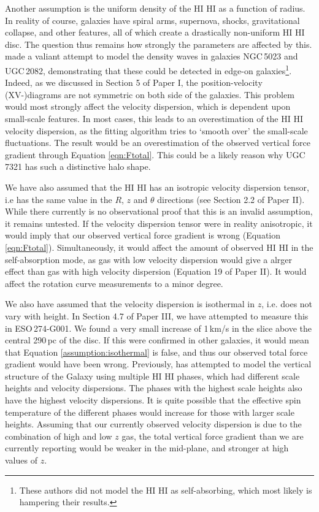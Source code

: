 \documentclass[useAMS,usenatbib]{mn2e}
\newcommand{\hi}{%
  \relax
  \ifmmode
    \textrm{\textsc{HI}}
  \else
    \textsc{H{\smaller}I}
  \fi
}
\begin{document}
Another assumption is the uniform density of the \hi as a function of radius.
In reality of course, galaxies have spiral arms, supernova, shocks, 
gravitational collapse, and other features, all of which create a 
drastically non-uniform \hi disc. 
The question thus remains how strongly the parameters are affected by this. 
\citet{Kamphuis2013A} made a valiant attempt to model the density waves 
in galaxies NGC\,5023 and UGC\,2082, demonstrating that these could be 
detected in edge-on galaxies\footnote{These authors did not 
model the \hi as self-absorbing, which most likely is hampering their results.}.
Indeed, as we discussed in Section 5 of Paper I, the position-velocity 
(XV-)diagrams are not symmetric on both side of the galaxies.
This problem would most strongly affect the velocity dispersion, which is 
dependent upon small-scale features. 
In most cases, this leads to an overestimation of the \hi velocity dispersion, 
as the fitting algorithm tries to `smooth over' the small-scale fluctuations.
The result would be an overestimation of the observed 
vertical force gradient through Equation \ref{eqn:Ftotal}. 
This could be a likely reason why UGC\,7321 has such a distinctive halo shape.

We have also assumed that the \hi has an isotropic velocity dispersion 
tensor, i.e has the same value in the $R$, $z$ and $\theta$ directions 
(see Section 2.2 of Paper II).
While there currently is no observational proof that this is an invalid 
assumption, it remains untested.
If the velocity dispersion tensor were in reality anisotropic, it would imply 
that our observed vertical force gradient is wrong (Equation \ref{eqn:Ftotal}). 
Simultaneously, it would affect the amount of observed \hi in the 
self-absorption mode, as gas with low velocity dispersion would give
a alrger effect than gas with high velocity dispersion 
(Equation 19 of Paper II).
It would affect the rotation curve measurements to a minor degree.

We also have assumed that the velocity dispersion is isothermal 
in $z$, i.e. does not vary with height. 
In Section 4.7 of Paper III, we have attempted to 
measure this in ESO\,274-G001. 
We found a very small increase of 1\,km/s in the slice above the central 
290\,pc of the disc. 
If this were confirmed in other galaxies, it would mean that Equation 
\ref{assumption:isothermal} is false, and thus our observed total force 
gradient would have been wrong.
Previously, \citet{Lockman1991} has attempted to model the vertical 
structure of the Galaxy using multiple \hi phases, which had different 
scale heights and velocity dispersions. 
The phases with the highest scale heights also have the highest velocity 
dispersions.
It is quite possible that the effective spin temperature of the different
phases would increase for those with larger scale heights.
Assuming that our currently observed velocity dispersion is due to the 
combination of high and low $z$ gas,  the total vertical force gradient 
than we are currently reporting would be weaker in the mid-plane, and 
stronger at high values of $z$.
\end{document}
